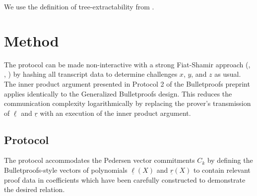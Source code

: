 \documentclass{article}
\theoremstyle{definition}
\begin{document}
We use the definition of tree-extractability from \cite{bootle2016efficient}.

\section{Method}



The protocol can be made non-interactive with a strong Fiat-Shamir approach (\cite{fiat1986prove}, \cite{pointcheval1996security}, \cite{bernhard2012not}) by hashing all transcript data to determine challenges $x$, $y$, and $z$ as usual. 
The inner product argument presented in Protocol 2 of the Bulletproofs preprint \cite{bp} applies identically to the Generalized Bulletproofs design.
This reduces the communication complexity logarithmically by replacing the prover's transmission of $\underline{\ell}$ and $\underline{r}$ with an execution of the inner product argument.






\subsection{Protocol}

The protocol accommodates the Pedersen vector commitments $C_k$ by defining the Bulletproofs-style vectors of polynomials $\underline{\ell}(X)$ and $\underline{r}(X)$ to contain relevant proof data in coefficients which have been carefully constructed to demonstrate the desired relation. 
\end{document}

